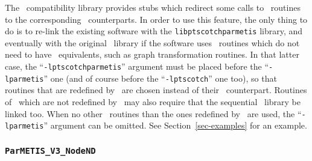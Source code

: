 The \parmetis\ compatibility library provides stubs which redirect some
calls to \parmetis\ routines to the corresponding \ptscotch\ counterparts.
In order to use this feature, the only thing to do is to re-link the
existing software with the {\tt lib\lbo ptscotch\lbo parmetis} library, and
eventually with the original \parmetis\ library if the software uses
\parmetis\ routines which do not need to have \ptscotch\ equivalents, such
as graph transformation routines.
In that latter case, the ``{\tt -lptscotch\lbt parmetis}'' argument must be
placed before the ``{\tt -lparmetis}'' one (and of course before the
``{\tt -lptscotch}'' one too), so that routines that are redefined by
\ptscotch\ are chosen instead of their \parmetis\ counterpart. Routines
of \parmetis\ which are not redefined by \ptscotch\ may also require
that the sequential \metis\ library be linked too. When no other
\parmetis\ routines than the ones redefined by \ptscotch\ are used,
the ``{\tt -lparmetis}'' argument can be omitted. See
Section~\ref{sec-examples} for an example.

\subsubsection{{\tt ParMETIS\_V3\_NodeND}}


